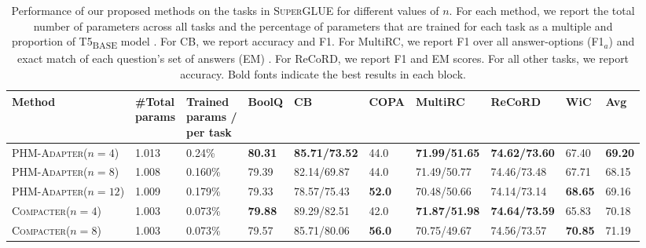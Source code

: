 \documentclass{article}
\newcommand{\basebase}{T5\textsubscript{\tiny BASE}\xspace}
\newcommand{\compacter}{\textsc{Compacter}\xspace}
\newcommand{\phmadapter}{\textsc{PHM-Adapter}\xspace}
\newcommand{\superglue}{\textsc{SuperGLUE}\xspace}
\begin{document}
\begin{table}[H] %
\centering 
\caption{Performance of our proposed methods on the tasks in \superglue for different values of $n$. For each method, we report the total number of parameters across all tasks and the percentage of parameters that are trained for each task as a multiple and proportion of \basebase model \citep{raffel2019exploring}. For CB, we report accuracy and F1. For MultiRC, we report  F1 over all answer-options (F1$_a$) and exact match of each question's set of answers (EM) \cite{wang2019superglue}. For ReCoRD, we report F1 and EM scores. For all other tasks, we report accuracy. Bold fonts indicate the best results in each block.}
\begin{adjustbox}{max width=\textwidth}
\begin{tabular}{l@{\hskip 0.02in}|l@{\hskip 0.06in}l@{\hskip 0.0in}|l@{\hskip 0.08in}l@{\hskip 0.08in}l@{\hskip 0.08in}l@{\hskip 0.08in}l@{\hskip 0.08in}l@{\hskip 0.08in}|l}
\toprule %
\textbf{Method} & \pbox{3cm}{\textbf{\#Total}\\ \textbf{params}} & \pbox{3cm}{\textbf{Trained} \\ \textbf{params /}\\ \textbf{per task\vspace{0.1em}}} & \textbf{BoolQ} &    \textbf{CB} &   \textbf{COPA} &   \textbf{MultiRC} &     \textbf{ReCoRD} & \textbf{WiC}  & \textbf{Avg} \\
\toprule 
\phmadapter ($n=4$)& 1.013 &0.24\% & \textbf{80.31} &  \textbf{85.71/73.52} &            44.0 &       \textbf{71.99/51.65} &       \textbf{74.62/73.60} &          67.40 &  \textbf{69.20}\\
\phmadapter ($n=8$) &1.008 &0.160\% &79.39 &  82.14/69.87 &            44.0 &       71.49/50.77 &      74.46/73.48 &          67.71 &  68.15  \\
\phmadapter ($n=12$)&1.009 & 0.179\% &79.33 &  78.57/75.43 &            \textbf{52.0} &       70.48/50.66 &      74.14/73.14 &          \textbf{68.65} &  69.16\\
\midrule 
\compacter ($n=4$) &1.003& 0.073\%& \textbf{79.88} &  89.29/82.51 &            42.0 &       \textbf{71.87/51.98} &   \textbf{74.64/73.59}       & 65.83 & 70.18 \\
\compacter ($n=8$) &1.003& 0.073\%&  79.57 &  85.71/80.06 &            \textbf{56.0} &       70.75/49.67 &    74.56/73.57     &  \textbf{70.85} & 71.19 \\

\end{tabular}
\end{adjustbox}
\end{table}
\end{document}
